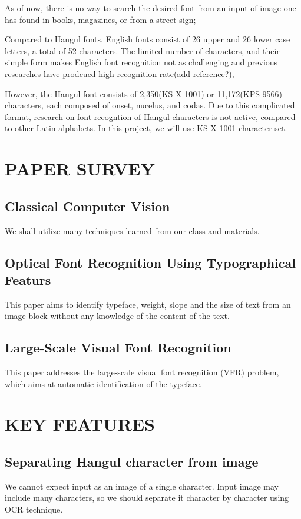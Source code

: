 \documentclass[%
 reprint,
nofootinbib,
nobibnotes,
amsmath,amssymb,
aps,
]{revtex4-1}
\begin{document}
As of now, there is no way to search the desired font from an input of image one has found in books,
magazines, or from a street sign;

Compared to Hangul fonts, English fonts consist of 26 upper and 26 lower case
letters, a total of 52 characters. The limited number of characters, and their
simple form makes English font recognition not as challenging and previous
researches have prodcued high recognition rate(add reference?),

However, the Hangul font consists of 2,350(KS X 1001) or 11,172(KPS 9566)
characters, each composed of onset, nucelus, and codas. Due to this complicated
format, research on font recogntion of Hangul characters is not active, compared to other Latin alphabets.
In this project, we will use KS X 1001 character set.


\section{\label{sec:level1}PAPER SURVEY}

\subsection{\label{sec:level2}Classical Computer Vision}
We shall utilize many techniques learned from our class and materials.

\subsection{\label{sec:level2}Optical Font Recognition Using Typographical
Featurs}
This paper\cite{zramdini} aims to identify typeface, weight, slope and the size of
text from an image block without any knowledge of the content of the text.

\subsection{\label{sec:level2}Large-Scale Visual Font Recognition}
This paper\cite{chen} addresses the large-scale visual font recognition (VFR)
problem, which aims at automatic identification of the typeface.

\section{\label{sec:level2}KEY FEATURES}
\subsection{\label{sec:level3} Separating Hangul character from image}
We cannot expect input as an image of a single character.
Input image may include many characters, so we should separate it
character by character using OCR technique.
\end{document}
